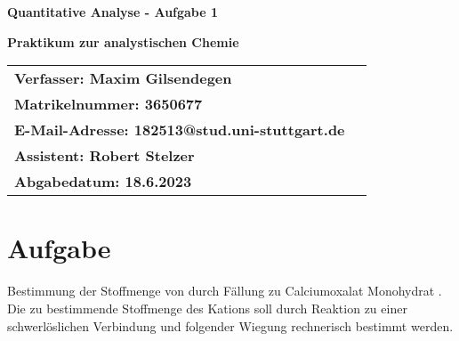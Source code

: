 \documentclass[12pt]{scrartcl} %
\begin{document}
\begin{titlepage}
\begin{center}
\vspace*{2cm}
\begin{LARGE}
\vspace*{1cm}
\textbf{\textsf{Quantitative Analyse - Aufgabe 1\\}}
\end{LARGE}
\vspace*{1cm}
\textbf{\textsf{Praktikum zur analystischen Chemie}}\\
\vspace*{1.5cm}
\begin{table}[H]
\sffamily
\hspace*{3cm}\begin{tabular}{>{\bfseries}l>{\bfseries}l}
Verfasser: Maxim Gilsendegen\\
Matrikelnummer: 3650677\\
E-Mail-Adresse: 182513@stud.uni-stuttgart.de\\
Assistent: Robert Stelzer\\
Abgabedatum: 18.6.2023\\
\end{tabular}
\end{table}
\end{center}
\end{titlepage}
\renewcommand{\thepage}{\Roman{page}}\setcounter{page}{1}
\tableofcontents %
\newpage
\renewcommand{\thepage}{\arabic{page}}\setcounter{page}{1}

\section{Aufgabe}
Bestimmung der Stoffmenge von  durch Fällung zu Calciumoxalat Monohydrat .\\
Die zu bestimmende Stoffmenge des Kations soll durch Reaktion zu einer schwerlöslichen Verbindung und folgender Wiegung rechnerisch bestimmt werden.
\end{document}

